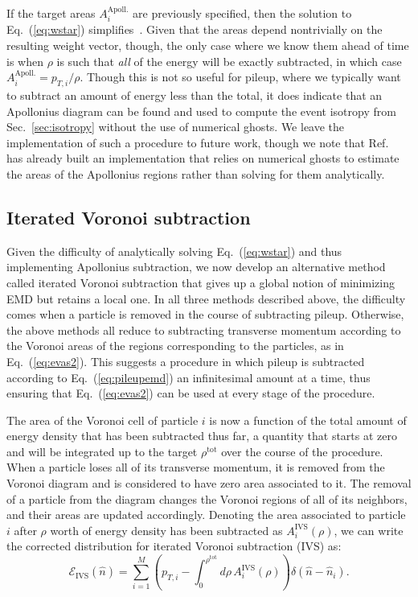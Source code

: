 \documentclass[letterpaper,11pt]{article}
\newcommand{\E}{\mathcal{E}}
\DeclareRobustCommand{\Sec}[1]{Sec.~\ref{#1}}
\DeclareRobustCommand{\Eq}[1]{Eq.~(\ref{#1})}
\DeclareRobustCommand{\Ref}[1]{Ref.~\cite{#1}}
\begin{document}
If the target areas $A_i^\text{Apoll.}$ are previously specified, then the solution to \Eq{eq:wstar} simplifies~\cite{hartmann2017semi}.
%
Given that the areas depend nontrivially on the resulting weight vector, though, the only case where we know them ahead of time is when $\rho$ is such that \emph{all} of the energy will be exactly subtracted, in which case $A_i^\text{Apoll.}=p_{T,i}/\rho$.
%
Though this is not so useful for pileup, where we typically want to subtract an amount of energy less than the total, it does indicate that an Apollonius diagram can be found and used to compute the event isotropy from \Sec{sec:isotropy} without the use of numerical ghosts.
%
We leave the implementation of such a procedure to future work, though we note that \Ref{hartmann2017semi} has already built an implementation that relies on numerical ghosts to estimate the areas of the Apollonius regions rather than solving for them analytically.


\subsection{Iterated Voronoi subtraction}
\label{sec:ivs}


Given the difficulty of analytically solving \Eq{eq:wstar} and thus implementing Apollonius subtraction, we now develop an alternative method called iterated Voronoi subtraction that gives up a global notion of minimizing EMD but retains a local one.
%
In all three methods described above, the difficulty comes when a particle is removed in the course of subtracting pileup.
%
Otherwise, the above methods all reduce to subtracting transverse momentum according to the Voronoi areas of the regions corresponding to the particles, as in \Eq{eq:evas2}.
%
This suggests a procedure in which pileup is subtracted according to \Eq{eq:pileupemd} an infinitesimal amount at a time, thus ensuring that \Eq{eq:evas2} can be used at every stage of the procedure.


The area of the Voronoi cell of particle $i$ is now a function of the total amount of energy density that has been subtracted thus far, a quantity that starts at zero and will be integrated up to the target $\rho^\text{tot}$ over the course of the procedure.
%
When a particle loses all of its transverse momentum, it is removed from the Voronoi diagram and is considered to have zero area associated to it.
%
The removal of a particle from the diagram changes the Voronoi regions of all of its neighbors, and their areas are updated accordingly.
%
Denoting the area associated to particle $i$ after $\rho$ worth of energy density has been subtracted as $A_i^\text{IVS}(\rho)$, we can write the corrected distribution for iterated Voronoi subtraction (IVS) as:
%
\begin{equation}
\label{eq:corrivs}
\E_\text{IVS}(\hat n)=\sum_{i=1}^M\left(p_{T,i} - \int_0^{\rho^\text{tot}} d\rho\,A_i^\text{IVS}(\rho)\right)\delta(\hat n-\hat n_i).
\end{equation}
\end{document}
